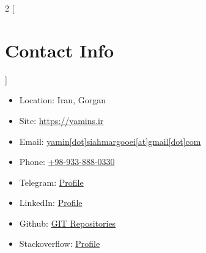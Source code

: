 \begin{multicols}{2}
[\section*{\LARGE{Contact Info}}]
    \begin{itemize}
        \item Location: Iran, Gorgan
        \item Site: \href{https://yamins.ir}{https://yamins.ir}
        \item Email: \href{mailto:yamin.siahmargooei@gmail.com}{yamin[dot]siahmargooei[at]gmail[dot]com}
        \item Phone: \href{tel:0989338880330}{+98-933-888-0330}
        \item Telegram: \href{https://t.me/yamins}{Profile}
        \item LinkedIn: \href{https://linkedin.com/in/yaminsm}{Profile}
        \item Github: \href{https://github.com/yamin8000}{GIT Repositories}
        \item Stackoverflow: \href{https://stackoverflow.com/users/15055605/yamin}{Profile}
    \end{itemize}
\end{multicols}